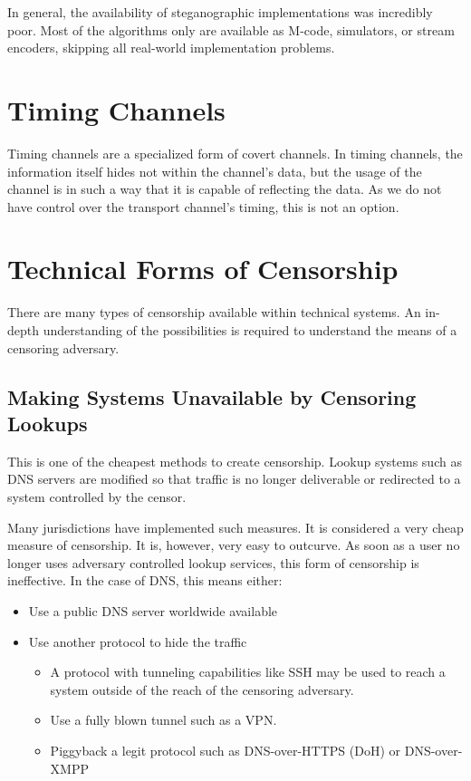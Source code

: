 In general, the availability of steganographic implementations was incredibly poor. Most of the algorithms only are available as M-code, simulators, or stream encoders, skipping all real-world implementation problems.

\section{Timing Channels}

Timing channels are a specialized form of covert channels. In timing channels, the information itself hides not within the channel's data, but the usage of the channel is in such a way that it is capable of reflecting the data. As we do not have control over the transport channel's timing, this is not an option.

\section{Technical Forms of Censorship}
There are many types of censorship available within technical systems. An in-depth understanding of the possibilities is required to understand the means of a censoring adversary.

\subsection{Making Systems Unavailable by Censoring Lookups}
This is one of the cheapest methods to create censorship. Lookup systems such as DNS servers are modified so that traffic is no longer deliverable or redirected to a system controlled by the censor.

Many jurisdictions have implemented such measures. It is considered a very cheap measure of censorship. It is, however, very easy to outcurve. As soon as a user no longer uses adversary controlled lookup services, this form of censorship is ineffective. In the case of DNS, this means either: 

\begin{itemize}
	\item Use a public DNS server worldwide available
	\item Use another protocol to hide the traffic 
	\begin{itemize}
		\item A protocol with tunneling capabilities like SSH may be used to reach a system outside of the reach of the censoring adversary.
		\item Use a fully blown tunnel such as a VPN.
		\item Piggyback a legit protocol such as DNS-over-HTTPS (DoH)\cite{rfc8484} or DNS-over-XMPP\cite{xep0418}
	\end{itemize}
\end{itemize}

